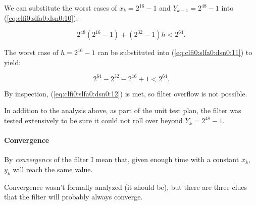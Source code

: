 We can substitute the worst cases of $x_k = 2^{16}-1$ and $Y_{k-1} = 2^{48}-1$ into
(\ref{eq:clfi0:slfa0:dsn0:10}):

\begin{equation}
\label{eq:clfi0:slfa0:dsn0:11}
2^{48}(2^{16}-1) + (2^{32}-1)h < 2^{64} .
\end{equation}

The worst case of $h=2^{16}-1$ can be substituted into
(\ref{eq:clfi0:slfa0:dsn0:11}) to yield:

\begin{equation}
\label{eq:clfi0:slfa0:dsn0:12}
2^{64} - 2^{32} - 2^{16} + 1 < 2^{64} .
\end{equation}

By inspection, (\ref{eq:clfi0:slfa0:dsn0:12}) is met, so filter overflow is not
possible.

In addition to the analysis above, as part of the unit test plan, 
the filter was tested extensively to be
sure it could not roll over beyond $Y_k = 2^{48}-1$\@.  


\paragraph{Convergence}

By \emph{convergence} of the filter I mean that, given enough time with
a constant $x_k$, $y_k$ will reach the same value.

Convergence wasn't formally analyzed (it should be), but there are three
clues that the filter will probably always converge.

